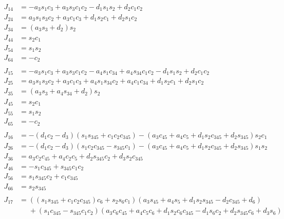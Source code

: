 \documentclass{article}
\begin{document}
\begin{align*}
J_{14} &= - a_{3} s_{1} c_{3} + a_{3} s_{3} c_{1} c_{2} - d_{1} s_{1} s_{2} + d_{2} c_{1} c_{2} \\
J_{24} &= a_{3} s_{1} s_{3} c_{2} + a_{3} c_{1} c_{3} + d_{1} s_{2} c_{1} + d_{2} s_{1} c_{2} \\
J_{34} &= \left(a_{3} s_{3} + d_{2}\right) s_{2} \\
J_{44} &= s_{2} c_{1} \\
J_{54} &= s_{1} s_{2} \\
J_{64} &= - c_{2} \\
\\
J_{15} &= - a_{3} s_{1} c_{3} + a_{3} s_{3} c_{1} c_{2} - a_{4} s_{1} c_{34} + a_{4} s_{34} c_{1} c_{2} - d_{1} s_{1} s_{2} + d_{2} c_{1} c_{2} \\
J_{25} &= a_{3} s_{1} s_{3} c_{2} + a_{3} c_{1} c_{3} + a_{4} s_{1} s_{34} c_{2} + a_{4} c_{1} c_{34} + d_{1} s_{2} c_{1} + d_{2} s_{1} c_{2} \\
J_{35} &= \left(a_{3} s_{3} + a_{4} s_{34} + d_{2}\right) s_{2} \\
J_{45} &= s_{2} c_{1} \\
J_{55} &= s_{1} s_{2} \\
J_{65} &= - c_{2} \\
\\
J_{16} &= - \left(d_{1} c_{2} - d_{3}\right) \left(s_{1} s_{345} + c_{1} c_{2} c_{345}\right) - \left(a_{3} c_{45} + a_{4} c_{5} + d_{1} s_{2} c_{345} + d_{2} s_{345}\right) s_{2} c_{1} \\
J_{26} &= - \left(d_{1} c_{2} - d_{3}\right) \left(s_{1} c_{2} c_{345} - s_{345} c_{1}\right) - \left(a_{3} c_{45} + a_{4} c_{5} + d_{1} s_{2} c_{345} + d_{2} s_{345}\right) s_{1} s_{2} \\
J_{36} &= a_{3} c_{2} c_{45} + a_{4} c_{2} c_{5} + d_{2} s_{345} c_{2} + d_{3} s_{2} c_{345} \\
J_{46} &= - s_{1} c_{345} + s_{345} c_{1} c_{2} \\
J_{56} &= s_{1} s_{345} c_{2} + c_{1} c_{345} \\
J_{66} &= s_{2} s_{345} \\
\\
J_{17} &= \left(\left(s_{1} s_{345} + c_{1} c_{2} c_{345}\right) c_{6} + s_{2} s_{6} c_{1}\right) \left(a_{3} s_{45} + a_{4} s_{5} + d_{1} s_{2} s_{345} - d_{2} c_{345} + d_{6}\right) \\
       &\phantom{=}+ \left(s_{1} c_{345} - s_{345} c_{1} c_{2}\right) \left(a_{3} c_{6} c_{45} + a_{4} c_{5} c_{6} + d_{1} s_{2} c_{6} c_{345} - d_{1} s_{6} c_{2} + d_{2} s_{345} c_{6} + d_{3} s_{6}\right) \\

\end{align*}
\end{document}
